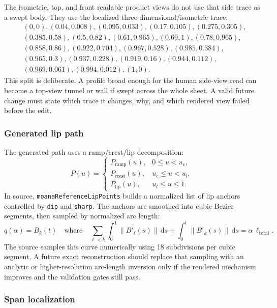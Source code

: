 \documentclass[12pt,letterpaper]{article}
\newcommand{\code}[1]{\texttt{#1}}
\newcommand{\norm}[1]{\left\lVert #1 \right\rVert}
\newcommand{\dd}{\mathrm{d}}
\begin{document}
The isometric, top, and front readable product views do not use that side trace as a swept body. They use the localized three-dimensional/isometric trace:
\[
\begin{split}
&(0,0),(0.04,0.008),(0.095,0.033),(0.17,0.105),(0.275,0.305),\\
&(0.385,0.58),(0.5,0.82),(0.61,0.965),(0.69,1),(0.78,0.965),\\
&(0.858,0.86),(0.922,0.704),(0.967,0.528),(0.985,0.384),\\
&(0.965,0.3),(0.937,0.228),(0.919,0.16),(0.944,0.112),\\
&(0.969,0.061),(0.994,0.012),(1,0).
\end{split}
\]
This split is deliberate. A profile broad enough for the human side-view read can become a top-view tunnel or wall if swept across the whole sheet. A valid future change must state which trace it changes, why, and which rendered view failed before the edit.

\subsubsection{Generated lip path}

The generated path uses a ramp/crest/lip decomposition:
\[
  P(u)=
  \begin{cases}
    P_{\mathrm{ramp}}(u), & 0\le u<u_c,\\
    P_{\mathrm{crest}}(u), & u_c\le u<u_l,\\
    P_{\mathrm{lip}}(u), & u_l\le u\le1.
  \end{cases}
\]
In source, \code{moanaReferenceLipPoints} builds a normalized list of lip anchors controlled by \code{dip} and \code{sharp}. The anchors are smoothed into cubic Bezier segments, then sampled by normalized arc length:
\[
  q(\alpha)=B_k(t)\quad\text{where}\quad
  \sum_{\ell<k}\int_0^1\norm{B'_\ell(s)}\,\dd s+
  \int_0^t\norm{B'_k(s)}\,\dd s
  =\alpha\,\ell_{\mathrm{total}}.
\]
The source samples this curve numerically using 18 subdivisions per cubic segment. A future exact reconstruction should replace that sampling with an analytic or higher-resolution arc-length inversion only if the rendered mechanism improves and the validation gates still pass.

\subsubsection{Span localization}
\end{document}
